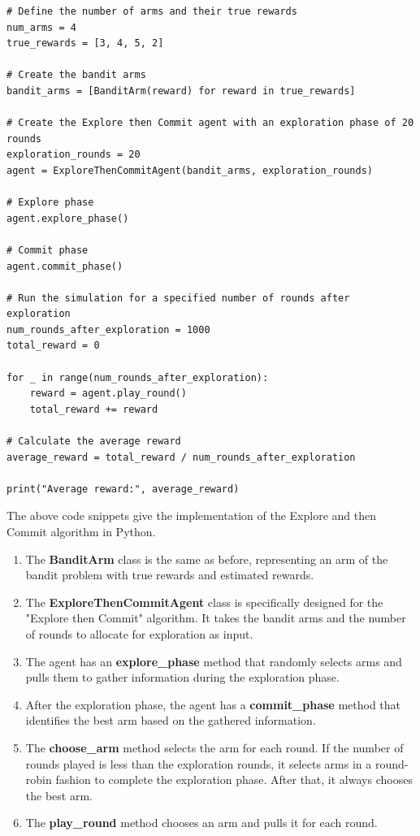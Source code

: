 \documentclass{article}
\begin{document}
\begin{lstlisting}
# Define the number of arms and their true rewards
num_arms = 4
true_rewards = [3, 4, 5, 2]

# Create the bandit arms
bandit_arms = [BanditArm(reward) for reward in true_rewards]

# Create the Explore then Commit agent with an exploration phase of 20 rounds
exploration_rounds = 20
agent = ExploreThenCommitAgent(bandit_arms, exploration_rounds)

# Explore phase
agent.explore_phase()

# Commit phase
agent.commit_phase()

# Run the simulation for a specified number of rounds after exploration
num_rounds_after_exploration = 1000
total_reward = 0

for _ in range(num_rounds_after_exploration):
    reward = agent.play_round()
    total_reward += reward

# Calculate the average reward
average_reward = total_reward / num_rounds_after_exploration

print("Average reward:", average_reward)

\end{lstlisting}
    


The above code snippets give the implementation of the Explore and then Commit algorithm in Python.

\begin{enumerate}
    \item The \textbf{BanditArm} class is the same as before, representing an arm of the bandit problem with true rewards and estimated rewards.

    \item The \textbf{ExploreThenCommitAgent} class is specifically designed for the "Explore then Commit" algorithm. It takes the bandit arms and the number of rounds to allocate for exploration as input.

    \item The agent has an \textbf{explore\_phase} method that randomly selects arms and pulls them to gather information during the exploration phase.

    \item After the exploration phase, the agent has a \textbf{commit\_phase} method that identifies the best arm based on the gathered information.

    \item The \textbf{choose\_arm} method selects the arm for each round. If the number of rounds played is less than the exploration rounds, it selects arms in a round-robin fashion to complete the exploration phase. After that, it always chooses the best arm.

    \item The \textbf{play\_round} method chooses an arm and pulls it for each round.

\end{enumerate}
\end{document}
